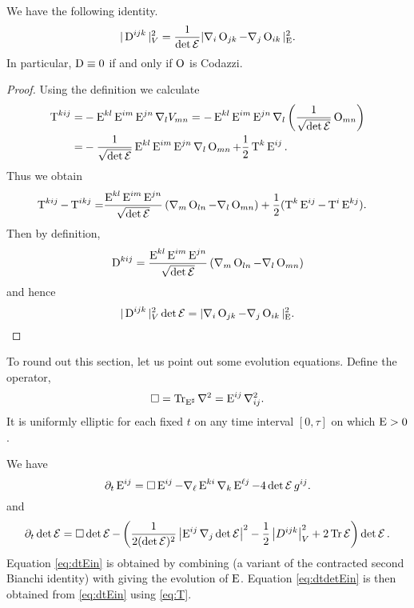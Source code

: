 \documentclass[a4paper,12pt]{amsart}
\begin{document}
\begin{lemma}
\label{lem:cubicform_codazzi}

We have the following identity.
\[
|\operatorname{D}^{ijk}|_V^2=\frac{1}{\det\operatorname{\mathcal{E}}}|\nabla_i\operatorname{O}_{jk}-\nabla_j\operatorname{O}_{ik}|_{\operatorname{E}}^2.
\]
In particular, \(\operatorname{D}\equiv 0\) if and only if \(\operatorname{O}\) is Codazzi.
\end{lemma}

\begin{proof}
Using the definition we calculate
\begin{align*}
\operatorname{T}^{kij}=&-\operatorname{E}^{kl}\operatorname{E}^{im}\operatorname{E}^{jn}\nabla_l V_{mn} = -\operatorname{E}^{kl}\operatorname{E}^{im}\operatorname{E}^{jn}\nabla_l \left(\frac{1}{\sqrt{\det\operatorname{\mathcal{E}}}} \operatorname{O}_{mn}\right)\\
=&-\frac{1}{\sqrt{\det\operatorname{\mathcal{E}}}}\operatorname{E}^{kl}\operatorname{E}^{im}\operatorname{E}^{jn}\nabla_l \operatorname{O}_{mn}+\frac{1}{2}\operatorname{T}^k\operatorname{E}^{ij}.
\end{align*}
Thus we obtain
\begin{align*}
\operatorname{T}^{kij}-\operatorname{T}^{ikj}=&\frac{\operatorname{E}^{kl}\operatorname{E}^{im}\operatorname{E}^{jn}}{\sqrt{\det\operatorname{\mathcal{E}}}}\left(\nabla_m \operatorname{O}_{ln}-\nabla_l \operatorname{O}_{mn}\right)+\frac{1}{2}(\operatorname{T}^k\operatorname{E}^{ij}-\operatorname{T}^i\operatorname{E}^{kj}).
\end{align*}
Then by definition,
\[
\operatorname{D}^{kij} = \frac{\operatorname{E}^{kl}\operatorname{E}^{im}\operatorname{E}^{jn}}{\sqrt{\det\operatorname{\mathcal{E}}}}\left(\nabla_m \operatorname{O}_{ln}-\nabla_l \operatorname{O}_{mn}\right)
\]
and hence
\[
|\operatorname{D}^{ijk}|_V^2\det\operatorname{\mathcal{E}} = |\nabla_i\operatorname{O}_{jk}-\nabla_j\operatorname{O}_{ik}|_{\operatorname{E}}^2.
\]
\end{proof}

To round out this section, let us point out some evolution equations. Define the operator,
\begin{equation}
\label{eq:box}
\Box = \operatorname{Tr}_{\operatorname{E}^{\sharp}} \nabla^2 = \operatorname{E}^{ij} \nabla^2_{ij}.
\end{equation}
It is uniformly elliptic for each fixed \(t\) on any time interval \([0, \tau]\) on which \(\operatorname{E} > 0\).

We have
\begin{equation}
\label{eq:dtEin}
\partial_t \operatorname{E}^{ij} = \Box \operatorname{E}^{ij} - \nabla_{\ell} \operatorname{E}^{ki} \nabla_k \operatorname{E}^{\ell j} - 4 \det \operatorname{\mathcal{E}} g^{ij}.
\end{equation}
and
\begin{equation}
\label{eq:dtdetEin}
\partial_t \det \operatorname{\mathcal{E}} = \Box \det \operatorname{\mathcal{E}} -\left(\frac{1}{2(\det\operatorname{\mathcal{E}})^2} \left\lvert{\operatorname{E}^{ij} \nabla_j \det \operatorname{\mathcal{E}}}\right\rvert^2 - \frac{1}{2}\left\lvert{D^{ijk}}\right\rvert_V^2 + 2\operatorname{Tr}\operatorname{\mathcal{E}}\right)\det \operatorname{\mathcal{E}}.
\end{equation}
Equation \eqref{eq:dtEin} is obtained by combining \cite[Lemma 1(a)]{MR2055396} (a variant of the contracted second Bianchi identity) with \cite[Lemma 5]{MR2055396} giving the evolution of \(\operatorname{E}\). Equation \eqref{eq:dtdetEin} is then obtained from \eqref{eq:dtEin} using \eqref{eq:T}.
\end{document}
